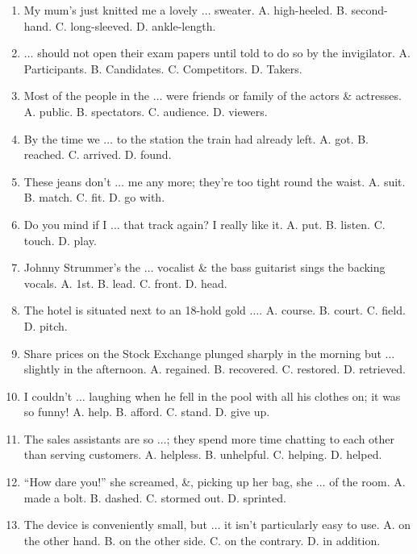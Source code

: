 \documentclass{article}
\numberwithin{equation}{section}
\begin{document}
\begin{enumerate}[leftmargin=8mm]
	\item My mum's just knitted me a lovely $\ldots$ sweater. {\sf A.} high-heeled. {\sf B.} second-hand. {\sf C.} long-sleeved. {\sf D.} ankle-length.
	\item $\ldots$ should not open their exam papers until told to do so by the invigilator. {\sf A.} Participants. {\sf B.} Candidates. {\sf C.} Competitors. {\sf D.} Takers.
	\item Most of the people in the $\ldots$ were friends or family of the actors \& actresses. {\sf A.} public. {\sf B.} spectators. {\sf C.} audience. {\sf D.} viewers.
	\item By the time we $\ldots$ to the station the train had already left. {\sf A.} got. {\sf B.} reached. {\sf C.} arrived. {\sf D.} found.
	\item These jeans don't $\ldots$ me any more; they're too tight round the waist. {\sf A.} suit. {\sf B.} match. {\sf C.} fit. {\sf D.} go with.
	\item Do you mind if I $\ldots$ that track again? I really like it. {\sf A.} put. {\sf B.} listen. {\sf C.} touch. {\sf D.} play.
	\item Johnny Strummer's the $\ldots$ vocalist \& the bass guitarist sings the backing vocals. {\sf A.} 1st. {\sf B.} lead. {\sf C.} front. {\sf D.} head.
	\item The hotel is situated next to an 18-hold gold $\ldots$. {\sf A.} course. {\sf B.} court. {\sf C.} field. {\sf D.} pitch.
	\item Share prices on the Stock Exchange plunged sharply in the morning but $\ldots$ slightly in the afternoon. {\sf A.} regained. {\sf B.} recovered. {\sf C.} restored. {\sf D.} retrieved.
	\item I couldn't $\ldots$ laughing when he fell in the pool with all his clothes on; it was so funny! {\sf A.} help. {\sf B.} afford. {\sf C.} stand. {\sf D.} give up.
	\item The sales assistants are so $\ldots$; they spend more time chatting to each other than serving customers. {\sf A.} helpless. {\sf B.} unhelpful. {\sf C.} helping. {\sf D.} helped.
	\item ``How dare you!'' she screamed, \&, picking up her bag, she $\ldots$ of the room. {\sf A.} made a bolt. {\sf B.} dashed. {\sf C.} stormed out. {\sf D.} sprinted.
	\item The device is conveniently small, but $\ldots$ it isn't particularly easy to use. {\sf A.} on the other hand. {\sf B.} on the other side. {\sf C.} on the contrary. {\sf D.} in addition.

\end{enumerate}
\end{document}
